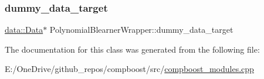 \subsubsection{\texorpdfstring{dummy\+\_\+data\+\_\+target}{dummy\_data\_target}}
{\footnotesize\ttfamily \mbox{\hyperlink{classdata_1_1_data}{data\+::\+Data}}$\ast$ Polynomial\+Blearner\+Wrapper\+::dummy\+\_\+data\+\_\+target\hspace{0.3cm}{\ttfamily [private]}}



The documentation for this class was generated from the following file\+:\begin{DoxyCompactItemize}
\item 
E\+:/\+One\+Drive/github\+\_\+repos/compboost/src/\mbox{\hyperlink{compboost__modules_8cpp}{compboost\+\_\+modules.\+cpp}}\end{DoxyCompactItemize}
